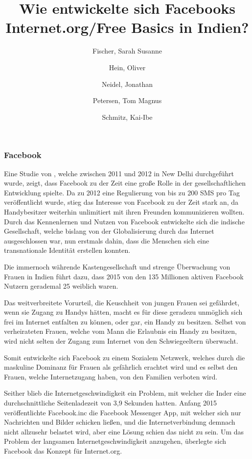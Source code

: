\documentclass{article}
\title{Wie entwickelte sich Facebooks Internet.org/Free Basics in Indien?}
\author{
  Fischer, Sarah Susanne\\
  \and
  Hein, Oliver\\
  \and
  Neidel, Jonathan\\
  \and
  Petersen, Tom Magnus\\
  \and
  Schmitz, Kai-Ibe\\
}
\begin{document}
\maketitle
\subsubsection {Facebook}
Eine Studie von \textcite{empowermentThroughFacebook}, welche zwischen 2011 und 2012 in New Delhi durchgeführt wurde, zeigt, dass Facebook zu der Zeit eine große Rolle in der gesellschaftlichen Entwicklung spielte. 
\medskip
Da zu 2012 eine Regulierung von bis zu 200 SMS pro Tag veröffentlicht wurde\autocite{PressInformation}, stieg das Interesse von Facebook zu der Zeit stark an,
da Handybesitzer weiterhin unlimitiert mit ihren Freunden kommunizieren wollten.
Durch das Kennenlernen und Nutzen von Facebook entwickelte sich die indische Gesellschaft, welche bislang von der Globalisierung durch das Internet ausgeschlossen war, nun erstmals dahin, dass die Menschen sich eine transnationale Identität erstellen konnten.
\medskip

Die immernoch währende Kastengesellschaft und strenge Überwachung von Frauen in Indien führt dazu, dass 2015 von den 135 Millionen aktiven Facebook Nutzern gerademal 25 weiblich waren.

Das weitverbreitete Vorurteil, die Keuschheit von jungen Frauen sei gefährdet, wenn sie Zugang zu Handys hätten, macht es für diese geradezu unmöglich sich frei im Internet entfalten zu können, oder gar, ein Handy zu besitzen. Selbst von verheirateten Frauen, welche vom Mann die Erlaubnis ein Handy zu besitzen, wird nicht selten der Zugang zum Internet von den Schwiegeeltern überwacht.


Somit entwickelte sich Facebook zu einem Sozialem Netzwerk, welches durch die maskuline Dominanz für Frauen als gefährlich erachtet wird und es selbst den Frauen, welche Internetzugang haben, von den Familien verboten wird.


\medskip
Seither blieb die Internetgeschwindigkeit ein Problem, mit welcher die Inder eine durchschnittliche Seitenladezeit von 3,9 Sekunden hatten\autocite{mashable}. Anfang 2015 veröffentlichte Facebook.inc die Facebook Messenger App, mit welcher sich nur Nachrichten und Bilder schicken ließen, und die Internetverbindung demnach nicht allzusehr belastet wird, aber eine Lösung schien das nicht zu sein.
\medskip
Um das Problem der langsamen Internetgeschwindigkeit anzugehen, überlegte sich Facebook das Konzept für Internet.org.


\end{document}
